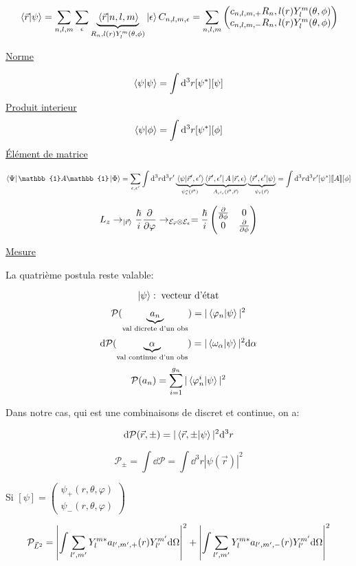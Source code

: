 \documentclass{article}
\begin{document}
$$\braket*{\vec r}{\psi} = \sum_{n,l,m}\sum_\epsilon \underbrace{\braket*{\vec r}{n,l,m}}_{R_n,l(r)Y_l^m(\theta,\phi)}\ket\epsilon C_{n,l,m,\epsilon} = \sum_{n,l,m}\begin{pmatrix}
	c_{n,l,m,+}R_n,l(r)Y_l^m(\theta,\phi)\\
	c_{n,l,m,-}R_n,l(r)Y_l^m(\theta,\phi)
\end{pmatrix}$$


\underline{Norme}

$$\braket{\psi} = \int \dd^3r [\psi^*][\psi]$$
\underline{Produit interieur}
$$\braket{\psi}{\phi} = \int \dd^3r [\psi^*][\phi]$$
\underline{Élément de matrice}

$$\bra  \Psi \mathbb{1} A \mathbb{1} \ket \Phi = \sum_{\epsilon, \epsilon'}\int\dd^3r\dd^3r' \underbrace{\braket*{\psi}{\vec r', \epsilon'}}_{\psi^*_\epsilon(\vec r')} \underbrace{\bra{\vec r', \epsilon'}A\ket{\vec r, \epsilon}}_{A_{\epsilon'\epsilon}(\vec r', \vec r)} \underbrace{\braket*{\vec r', \epsilon'}{\psi}}_{\psi_\epsilon(\vec r)} = \int\dd^3r\dd^3r' [\psi^*]\llbracket A\rrbracket [\phi]$$

$$L_z \to_{\ket{\vec r}} \frac{\hbar}{i}\pdv{}{\varphi} \to_{\mathcal{E}_{\vec r}\otimes \mathcal{E}_\epsilon} = \frac{\hbar}{i}\begin{pmatrix}
	\pdv{}{\phi} & 0 \\ 0 & \pdv{}{\phi}
\end{pmatrix}$$


\underline{Mesure}

La quatrième postula reste valable:

$$\ket\psi:\;\text{vecteur d'état}$$
$$\mathcal{P}(\underbrace{a_n}_{\text{val dicrete d'un obs}}) = |\braket*{\varphi_n}{\psi}|^2$$
$$\dd\mathcal{P}(\underbrace{\alpha}_{\text{val continue d'un obs}}) = |\braket*{\omega_\alpha}{\psi}|^2\dd \alpha$$
$$\mathcal{P}(a_n) = \sum_{i=1}^{g_n}|\braket*{\varphi_n^i}{\psi}|^2$$

Dans notre cas, qui est une combinaisons de discret et continue, on a:

$$\dd\mathcal{P}(\vec r, \pm) = |\braket*{\vec r, \pm}{\psi}|^2\dd^3 r$$

$$\mathcal{P}_\pm = \int \dd \mathcal{P} = \int \dd^3 r |\psi(\vec r)|^2$$

Si $[\psi] = \begin{pmatrix}
	\psi_+(r, \theta, \varphi)\\
	\psi_-(r, \theta, \varphi)
\end{pmatrix}$

$$\mathcal{P}_{\vec L ^2} = \abs{\int\sum_{l',m'}Y^{m*}_la_{l',m',+}(r)Y_{l'}^{m'}\dd \Omega}^2 +  \abs{\int\sum_{l',m'}Y^{m*}_la_{l',m',-}(r)Y_{l'}^{m'}\dd \Omega}^2$$
\end{document}
